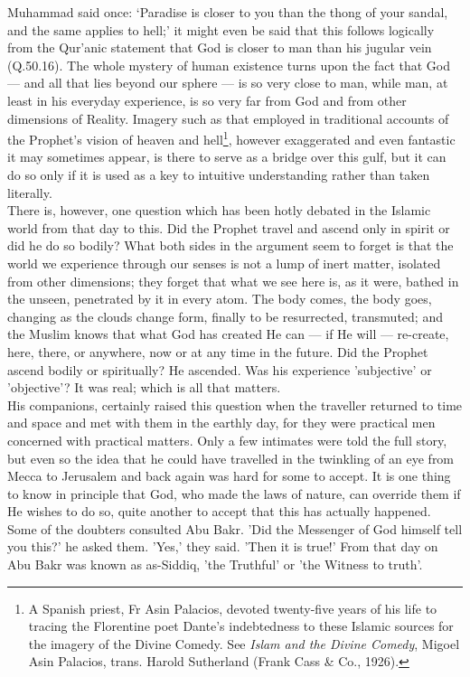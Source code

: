 \documentclass[10pt, twoside]{book}
\begin{document}
Muhammad said once: `Paradise is closer to you than the thong of your sandal, and the same applies to hell;' it might even be said that this follows logically from the Qur'anic statement that God is 
closer to man than his jugular vein (Q.50.16). The whole mystery of human existence turns upon the 
fact that God --- and all that lies beyond our sphere --- is so very close to man, while man, at least in 
his everyday experience, is so very far from God and from other dimensions of Reality. Imagery such 
as that employed in traditional accounts of the Prophet's vision of heaven and hell\footnote{A Spanish priest, Fr Asin Palacios, devoted twenty-five years of his life to tracing the Florentine poet Dante's indebtedness to these Islamic sources for the imagery of the Divine Comedy. See \emph{Islam and the Divine Comedy}, Migoel Asin Palacios, trans. Harold Sutherland (Frank Cass \& Co., 1926).}, however 
exaggerated and even fantastic it may sometimes appear, is there to serve as a bridge over this gulf, 
but it can do so only if it is used as a key to intuitive understanding rather than taken literally. \\ 

There is, however, one question which has been hotly debated in the Islamic world from that day to 
this. Did the Prophet travel and ascend only in spirit or did he do so bodily? What both sides in the 
argument seem to forget is that the world we experience through our senses is not a lump of inert 
matter, isolated from other dimensions; they forget that what we see here is, as it were, bathed in 
the unseen, penetrated by it in every atom. The body comes, the body goes, changing as the clouds 
change form, finally to be resurrected, transmuted; and the Muslim knows that what God has created He 
can --- if He will --- re-create, here, there, or anywhere, now or at any time in the future. Did the 
Prophet ascend bodily or spiritually? He ascended. Was his experience 'subjective' or 'objective'? It 
was real; which is all that matters. \\

His companions, certainly raised this question when the traveller returned to time and space and met 
with them in the earthly day, for they were practical men concerned with practical matters. Only a 
few intimates were told the full story, but even so the idea that he could have travelled in the 
twinkling of an eye from Mecca to Jerusalem and back again was hard for some to accept. It is one 
thing to know in principle that God, who made the laws of nature, can override them if He wishes to 
do so, quite another to accept that this has actually happened. Some of the doubters consulted Abu 
Bakr. 'Did the Messenger of God himself tell you this?' he asked them. 'Yes,' they said. 'Then it is 
true!' From that day on Abu Bakr was known as as\hyp{}Siddiq, 'the Truthful' or 'the Witness to truth'. \\
\end{document}
